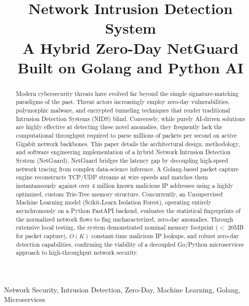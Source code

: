 \documentclass[conference]{IEEEtran}
\begin{document}
\title{Network Intrusion Detection System\\A Hybrid Zero-Day NetGuard Built on Golang and Python AI}

\author{
}
\setlength{\tabcolsep}{12pt}

\maketitle

\begin{abstract}
Modern cybersecurity threats have evolved far beyond the simple signature-matching paradigms of the past. Threat actors increasingly employ zero-day vulnerabilities, polymorphic malware, and encrypted tunneling techniques that render traditional Intrusion Detection Systems (NIDS) blind. Conversely, while purely AI-driven solutions are highly effective at detecting these novel anomalies, they frequently lack the computational throughput required to parse millions of packets per second on active Gigabit network backbones. This paper details the architectural design, methodology, and software engineering implementation of a hybrid Network Intrusion Detection System (NetGuard). NetGuard bridges the latency gap by decoupling high-speed network tracing from complex data-science inference. A Golang-based packet capture engine reconstructs TCP/UDP streams at wire speeds and matches them instantaneously against over 4 million known malicious IP addresses using a highly optimized, custom Trie-Tree memory structure. Concurrently, an Unsupervised Machine Learning model (Scikit-Learn Isolation Forest), operating entirely asynchronously on a Python FastAPI backend, evaluates the statistical fingerprints of the normalized network flows to flag uncharacterized, zero-day anomalies. Through extensive local testing, the system demonstrated nominal memory footprint ($<$ 20MB for packet capture), $O(K)$ constant-time malicious IP lookups, and robust zero-day detection capabilities, confirming the viability of a decoupled Go/Python microservices approach to high-throughput network security.
\end{abstract}

\begin{IEEEkeywords}
Network Security, Intrusion Detection, Zero-Day, Machine Learning, Golang, Microservices
\end{IEEEkeywords}
\end{document}
